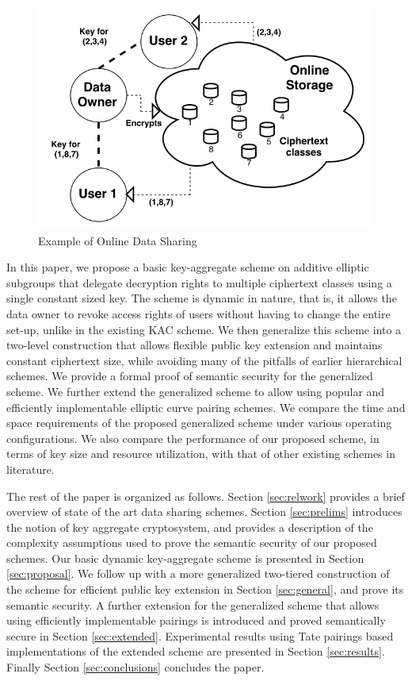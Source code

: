  
 \begin{figure}[!t]
\centering
\captionsetup{font=scriptsize}
\includegraphics[scale=0.25]{Figs/KeyAgg.png}
\caption{Example of Online Data Sharing}
\label{fig:intro}
\end{figure}


 In this paper, we propose a basic key-aggregate scheme on additive elliptic subgroups that delegate decryption rights to multiple ciphertext classes using a single constant sized key. The scheme is dynamic in nature, that is, it allows the data owner to revoke access rights of users without having to change the entire set-up, unlike in the existing KAC scheme.  We then generalize this scheme into a two-level construction that allows flexible public key extension and maintains constant ciphertext size, while avoiding many of the pitfalls of earlier hierarchical schemes. We provide a formal proof of semantic security for the generalized scheme. We further extend the generalized scheme to allow using popular and efficiently implementable elliptic curve pairing schemes. We compare the time and space requirements of the proposed generalized scheme under various operating configurations. We also compare the performance of our proposed scheme, in terms of key size and resource 
utilization, with that of other existing schemes in literature.

 The rest of the paper is organized as follows. Section \ref{sec:relwork} provides a brief overview of state of the art data sharing schemes. Section \ref{sec:prelims} introduces the notion of key aggregate cryptosystem, and provides a description of the complexity assumptions used to prove the semantic security of our proposed schemes. Our basic dynamic key-aggregate scheme is presented in Section \ref{sec:proposal}. We follow up with a more generalized two-tiered construction of the scheme for efficient public key extension in Section \ref{sec:general}, and prove its semantic security. A further extension for the generalized scheme that allows using efficiently implementable pairings is introduced and proved semantically secure in Section \ref{sec:extended}. Experimental results using Tate pairings based implementations of the extended scheme are presented in Section \ref{sec:results}. Finally Section \ref{sec:conclusions} concludes the paper.  


